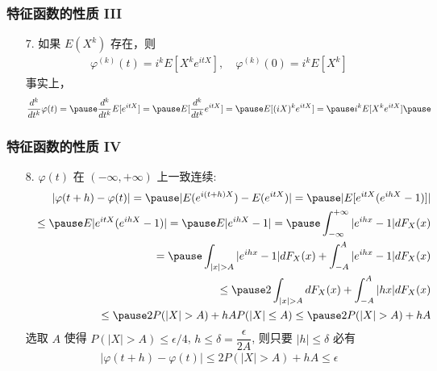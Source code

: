 \begin{frame}
	\frametitle{特征函数的性质 III}

	\begin{enumerate}
		\item[7.] 如果 $E (X^k)$ 存在，则
		\begin{eqnarray*}
			\varphi^{(k)}(t)=i^kE[X^ke^{itX}], \quad     \varphi^{(k)}(0)=i^kE[X^k]
		\end{eqnarray*}
		事实上，
		\begin{eqnarray*}
			\dfrac{d^k}{dt^k}\varphi(t)=\pause  \dfrac{d^k}{dt^k}E[e^{itX}]=\pause E[\dfrac{d^k}{dt^k}e^{itX}]=\pause E[(iX)^ke^{itX}]=\pause i^kE[X^ke^{itX}]\pause
		\end{eqnarray*}
	\end{enumerate}
\end{frame}
\begin{frame}
	\frametitle{特征函数的性质 IV}

	\begin{enumerate}
		\item[8.] $\varphi (t)$ 在 $(-\infty,+\infty)$ 上一致连续:
		\begin{eqnarray*}
			&&|\varphi(t+h)-\varphi(t)|=\pause |E(e^{i(t+h)X})-E(e^{itX})|=\pause |E[e^{itX}(e^{ihX}-1)]|\\
			&&\le\pause E|e^{itX}(e^{ihX}-1)|=\pause E|e^{ihX}-1|=\pause \int_{-\infty}^{+\infty}|e^{ihx}-1|dF_X(x)\\
			&&=\pause \int_{|x|>A}|e^{ihx}-1|dF_X(x)+\int_{-A}^A|e^{ihx}-1|dF_X(x)\\
			&&\le\pause 2 \int_{|x|>A}dF_X(x)+\int_{-A}^A|hx|dF_X(x)\\
			&&\le\pause 2P(|X|>A)+hAP(|X|\le A)\le \pause 2P(|X|>A)+hA
		\end{eqnarray*}
		\pause 选取 $A$ 使得 $P (|X|>A)\le \epsilon/4$, $h\le \delta=\dfrac{\epsilon}{2A}$, 则只要 $|h|\le \delta$ 必有
		\pause \begin{eqnarray*}
			|\varphi(t+h)-\varphi(t)|\le 2P(|X|>A)+hA\le \epsilon
		\end{eqnarray*}
	\end{enumerate}
\end{frame}
